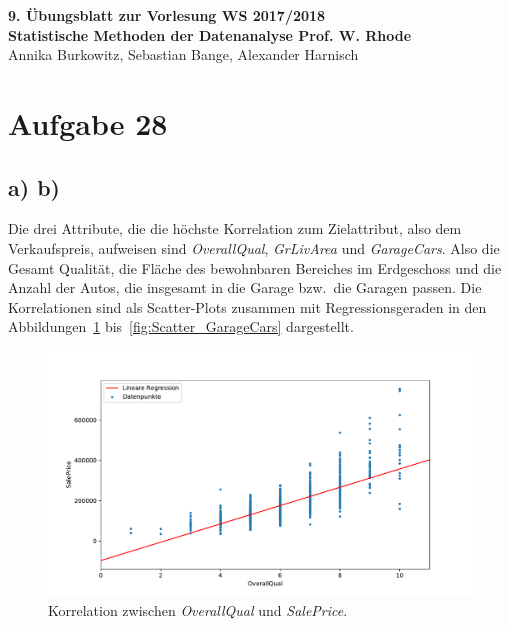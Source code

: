 \documentclass[a4paper, 11pt]{article}
\begin{document}
\noindent
\large{\textbf{9. Übungsblatt zur Vorlesung \hfill WS 2017/2018 \\
Statistische Methoden der Datenanalyse \hfill Prof. W. Rhode}} \\
Annika Burkowitz, Sebastian Bange, Alexander Harnisch \\
\noindent\makebox[\linewidth]{\rule{\textwidth}{0.4pt}}

\section*{Aufgabe 28}
\subsection*{a) b)}
Die drei Attribute, die die höchste Korrelation zum Zielattribut, also dem
Verkaufspreis, aufweisen sind \textit{OverallQual}, \textit{GrLivArea} und
\textit{GarageCars}. Also die Gesamt Qualität, die Fläche des bewohnbaren
Bereiches im Erdgeschoss und die Anzahl der Autos, die insgesamt in die Garage
bzw.\ die Garagen passen. Die Korrelationen sind als Scatter-Plots zusammen mit
Regressionsgeraden in den Abbildungen~\ref{fig:Scatter_OverallQual}
bis~\ref{fig:Scatter_GarageCars} dargestellt.
\begin{figure}
    \centering
    \includegraphics[width=\textwidth]{../A28abc/Scatter_OverallQual.pdf}
    \caption{Korrelation zwischen \textit{OverallQual} und \textit{SalePrice}.}
    \label{fig:Scatter_OverallQual}
\end{figure}
\end{document}
